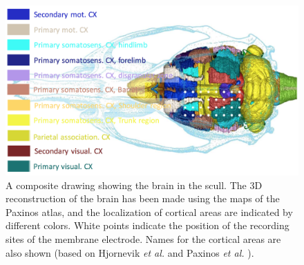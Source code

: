 \documentclass[journal,12pt,onecolumn,draftclsnofoot]{IEEEtran}  %
\begin{document}


\begin{figure}[!h]
  \centering
  \includegraphics[width=0.95\linewidth]{figures/rat_brain_schematic.png}
  \caption{A composite drawing showing the brain in the scull. The 3D reconstruction of the brain has been made using the maps of the Paxinos atlas, and the localization of cortical areas are indicated by different colors. White points indicate the position of the recording sites of the membrane electrode. Names for the cortical areas are also shown (based on Hjornevik \textit{et al.} and Paxinos \textit{et al.} \cite{hjornevik2007} \cite{paxinos2009}).}
  \label{fig:rat_brain_schematic}
\end{figure}
\end{document}
